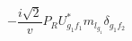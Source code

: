 %
\begin{dmath*}
%
  -  \frac{i \sqrt{2}}{v}P_R U_{g_1 f_1}^* m_{l_{g_1}} \delta_{g_1 f_2}
%
\end{dmath*}
%
